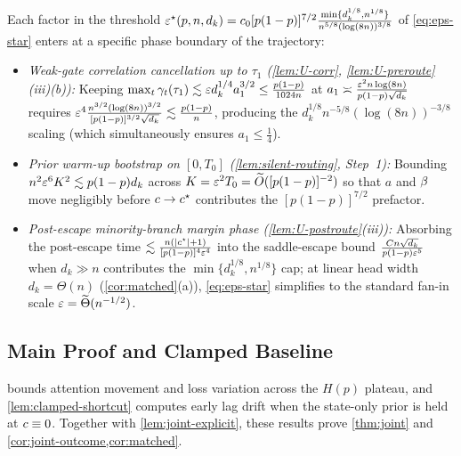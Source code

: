 \begin{remark}
\label{rem:eps-star-roles}
Each factor in the threshold $\varepsilon^\star(p, n, d_k) = c_0[p(1-p)]^{7/2}\frac{\min\{d_k^{1/8}, n^{1/8}\}}{n^{5/8}(\log(8n))^{3/8}}$ of \cref{eq:eps-star} enters at a specific phase boundary of the trajectory:
\begin{itemize}[leftmargin=*,itemsep=2pt,topsep=2pt]
\item \emph{Weak-gate correlation cancellation up to $\tau_1$ (\cref{lem:U-corr}, \cref{lem:U-preroute}(iii)(b)):} Keeping $\max_t\gamma_t(\tau_1) \lesssim \varepsilon d_k^{1/4}a_1^{3/2} \le \frac{p(1-p)}{1024n}$ at $a_1 \asymp \frac{\varepsilon^2 n\log(8n)}{p(1-p)\sqrt{d_k}}$ requires $\varepsilon^4\frac{n^{3/2}(\log(8n))^{3/2}}{[p(1-p)]^{3/2}\sqrt{d_k}} \lesssim \frac{p(1-p)}{n}$, producing the $d_k^{1/8} n^{-5/8}(\log(8n))^{-3/8}$ scaling (which simultaneously ensures $a_1 \le \frac{1}{4}$).
\item \emph{Prior warm-up bootstrap on $[0, T_0]$ (\cref{lem:silent-routing}, Step~1):} Bounding $n^2\varepsilon^6 K^2 \lesssim p(1-p)d_k$ across $K = \varepsilon^2 T_0 = \widetilde O([p(1-p)]^{-2})$ so that $a$ and $\beta$ move negligibly before $c \to c^\star$ contributes the $[p(1-p)]^{7/2}$ prefactor.
\item \emph{Post-escape minority-branch margin phase (\cref{lem:U-postroute}(iii)):} Absorbing the post-escape time $\lesssim \frac{n(|c^\star|+1)}{[p(1-p)]^4\varepsilon^4}$ into the saddle-escape bound $\frac{Cn\sqrt{d_k}}{p(1-p)\varepsilon^5}$ when $d_k \gg n$ contributes the $\min\{d_k^{1/8}, n^{1/8}\}$ cap; at linear head width $d_k = \Theta(n)$ (\cref{cor:matched}(a)), \cref{eq:eps-star} simplifies to the standard fan-in scale $\varepsilon = \widetilde\Theta(n^{-1/2})$.
\end{itemize}
\end{remark}

\subsection{Main Proof and Clamped Baseline}
\label{app:J-silent-obstruction}

 bounds attention movement and loss variation across the $H(p)$ plateau, and \cref{lem:clamped-shortcut} computes early lag drift when the state-only prior is held at $c \equiv 0$. Together with \cref{lem:joint-explicit}, these results prove \cref{thm:joint} and \cref{cor:joint-outcome,cor:matched}.

